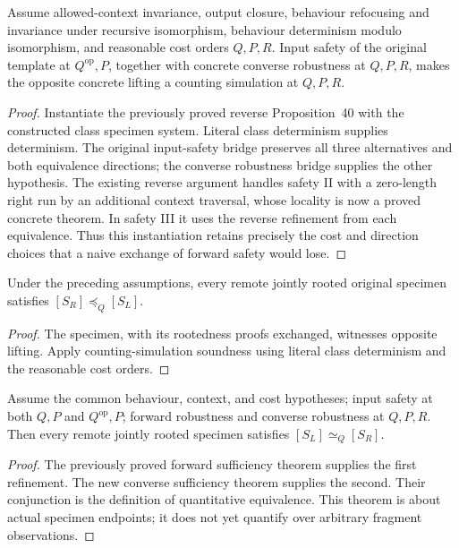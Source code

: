 \begin{theorem}
Assume allowed-context invariance, output closure, behaviour refocusing and invariance under recursive isomorphism, behaviour determinism modulo isomorphism, and reasonable cost orders $Q,P,R$. Input safety of the original template at $Q^{\mathrm{op}},P$, together with concrete converse robustness at $Q,P,R$, makes the opposite concrete lifting a counting simulation at $Q,P,R$.
\end{theorem}
\begin{proof}
Instantiate the previously proved reverse Proposition~40 with the constructed class specimen system. Literal class determinism supplies determinism. The original input-safety bridge preserves all three alternatives and both equivalence directions; the converse robustness bridge supplies the other hypothesis. The existing reverse argument handles safety II with a zero-length right run by an additional context traversal, whose locality is now a proved concrete theorem. In safety III it uses the reverse refinement from each equivalence. Thus this instantiation retains precisely the cost and direction choices that a naive exchange of forward safety would lose.
\end{proof}

\begin{theorem}
Under the preceding assumptions, every remote jointly rooted original specimen satisfies $[S_R]\preceq_Q[S_L]$.
\end{theorem}
\begin{proof}
The specimen, with its rootedness proofs exchanged, witnesses opposite lifting. Apply counting-simulation soundness using literal class determinism and the reasonable cost orders.
\end{proof}

\begin{theorem}
Assume the common behaviour, context, and cost hypotheses; input safety at both $Q,P$ and $Q^{\mathrm{op}},P$; forward robustness and converse robustness at $Q,P,R$. Then every remote jointly rooted specimen satisfies $[S_L]\simeq_Q[S_R]$.
\end{theorem}
\begin{proof}
The previously proved forward sufficiency theorem supplies the first refinement. The new converse sufficiency theorem supplies the second. Their conjunction is the definition of quantitative equivalence. This theorem is about actual specimen endpoints; it does not yet quantify over arbitrary fragment observations.
\end{proof}

